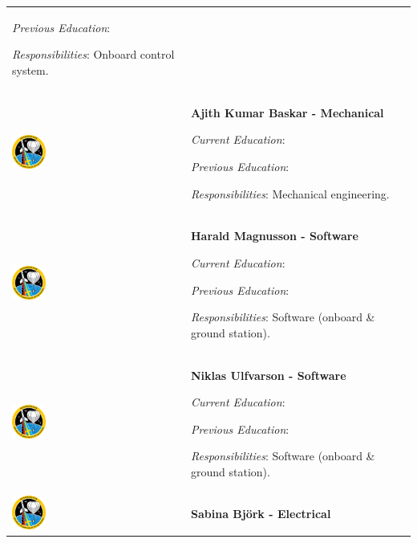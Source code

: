 \begin{longtable}[]{m{} m{}}
\smallskip
\textit{Previous Education}:

\smallskip
\textit{Responsibilities}: Onboard control system.
\bigskip
\\
 \includegraphics[width=0.2\textwidth]{0-cover/img/logo-rexus-bexus.png}  & \textbf{Ajith Kumar Baskar - Mechanical}

\smallskip
\textit{Current Education}: 

\smallskip
\textit{Previous Education}:

\smallskip
\textit{Responsibilities}: Mechanical engineering.
\bigskip
\\
 \includegraphics[width=0.2\textwidth]{0-cover/img/logo-rexus-bexus.png}  & \textbf{Harald Magnusson - Software}

\smallskip
\textit{Current Education}: 

\smallskip
\textit{Previous Education}:

\smallskip
\textit{Responsibilities}: Software (onboard \& ground station).
\bigskip
\\
 \includegraphics[width=0.2\textwidth]{0-cover/img/logo-rexus-bexus.png}  & \textbf{Niklas Ulfvarson - Software}

\smallskip
\textit{Current Education}: 

\smallskip
\textit{Previous Education}:

\smallskip
\textit{Responsibilities}: Software (onboard \& ground station).
\bigskip
\\
 \includegraphics[width=0.2\textwidth]{0-cover/img/logo-rexus-bexus.png}  & \textbf{Sabina Bj\"ork - Electrical}


\end{longtable}
